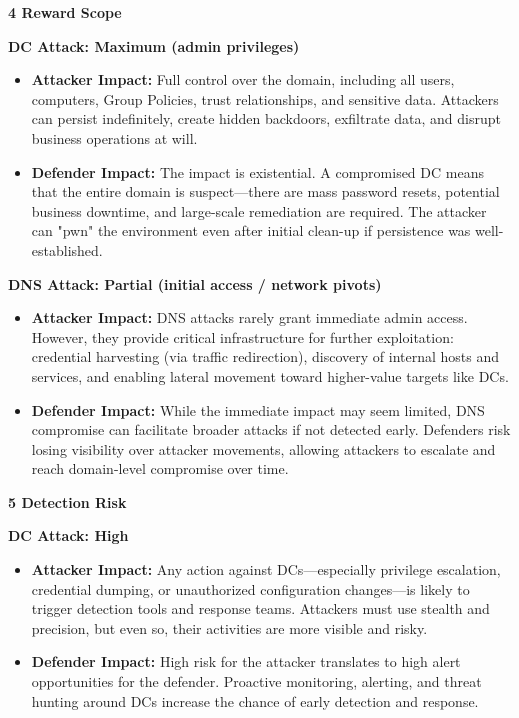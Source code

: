 \textbf{4 Reward Scope}

\textbf{DC Attack: Maximum (admin privileges)}

\begin{itemize}
    \item \textbf{\textbf{Attacker Impact:}}
Full control over the domain, including all users, computers, Group Policies, trust relationships, and sensitive data. Attackers can persist indefinitely, create hidden backdoors, exfiltrate data, and disrupt business operations at will.

    \item \textbf{\textbf{Defender Impact:}}
The impact is existential. A compromised DC means that the entire domain is suspect—there are mass password resets, potential business downtime, and large-scale remediation are required. The attacker can "pwn" the environment even after initial clean-up if persistence was well-established.

\end{itemize}

\textbf{DNS Attack: Partial (initial access / network pivots)}

\begin{itemize}
    \item \textbf{\textbf{Attacker Impact:}}
DNS attacks rarely grant immediate admin access. However, they provide critical infrastructure for further exploitation: credential harvesting (via traffic redirection), discovery of internal hosts and services, and enabling lateral movement toward higher-value targets like DCs.

    \item \textbf{\textbf{Defender Impact:}}
While the immediate impact may seem limited, DNS compromise can facilitate broader attacks if not detected early. Defenders risk losing visibility over attacker movements, allowing attackers to escalate and reach domain-level compromise over time.

\end{itemize}

\textbf{5 Detection Risk}

\textbf{DC Attack: High}

\begin{itemize}
    \item \textbf{\textbf{Attacker Impact:}}
Any action against DCs—especially privilege escalation, credential dumping, or unauthorized configuration changes—is likely to trigger detection tools and response teams. Attackers must use stealth and precision, but even so, their activities are more visible and risky.

    \item \textbf{\textbf{Defender Impact:}}
High risk for the attacker translates to high alert opportunities for the defender. Proactive monitoring, alerting, and threat hunting around DCs increase the chance of early detection and response.

\end{itemize}

